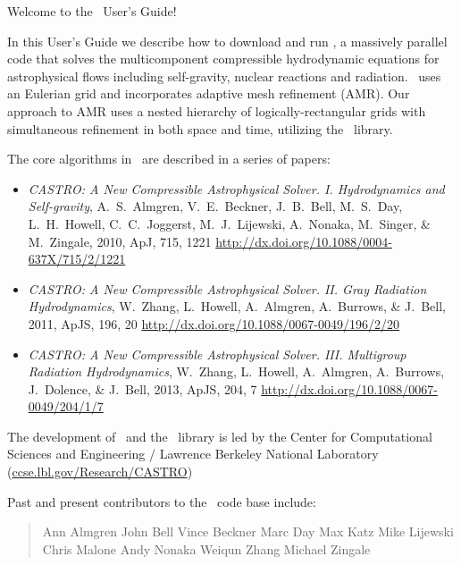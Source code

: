 Welcome to the \castro\ User's Guide!

In this User's Guide we describe how to download and run \castro, a
massively parallel code that solves the multicomponent compressible
hydrodynamic equations for astrophysical flows including self-gravity,
nuclear reactions and radiation.  \castro\ uses an Eulerian grid and
incorporates adaptive mesh refinement (AMR).  Our approach to AMR uses
a nested hierarchy of logically-rectangular grids with simultaneous
refinement in both space and time, utilizing the \boxlib\ library. 

The core algorithms in \castro\ are described in a series of papers:
\begin{itemize}
\item {\it CASTRO: A New Compressible Astrophysical Solver. I. Hydrodynamics and Self-gravity},
  A.~S.~Almgren, V.~E.~Beckner, J.~B.~Bell, M.~S.~Day, L.~H.~Howell, C.~C.~Joggerst, M.~J.~Lijewski,
  A.~Nonaka, M.~Singer, \& M.~Zingale, 2010, ApJ, 715, 1221\newline
  \url{http://dx.doi.org/10.1088/0004-637X/715/2/1221}

\item {\it CASTRO: A New Compressible Astrophysical Solver. II. Gray Radiation Hydrodynamics},
  W.~Zhang, L.~Howell, A.~Almgren, A.~Burrows, \& J.~Bell, 2011, ApJS, 196, 20\newline
  \url{http://dx.doi.org/10.1088/0067-0049/196/2/20}

\item {\it CASTRO: A New Compressible Astrophysical Solver. III. Multigroup Radiation Hydrodynamics},
  W.~Zhang, L.~Howell, A.~Almgren, A.~Burrows, J.~Dolence, \& J.~Bell, 2013, ApJS, 204, 7\newline
  \url{http://dx.doi.org/10.1088/0067-0049/204/1/7}

\end{itemize}         

The development of \castro\ and the \boxlib\ library is led by the Center for Computational
Sciences and Engineering / Lawrence Berkeley National Laboratory (\url{ccse.lbl.gov/Research/CASTRO})

Past and present contributors to the \castro\ code base include: %
\begin{quote}
Ann Almgren\newline
John Bell\newline
Vince Beckner\newline
Marc Day\newline
Max Katz\newline
Mike Lijewski\newline
Chris Malone\newline
Andy Nonaka\newline
Weiqun Zhang\newline
Michael Zingale
\end{quote}

